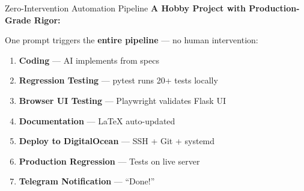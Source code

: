 \documentclass[aspectratio=169,11pt]{beamer}
\begin{document}
\begin{frame}{Zero-Intervention Automation Pipeline}
\textbf{A Hobby Project with Production-Grade Rigor:}

One prompt triggers the \textbf{entire pipeline} --- no human intervention:

\begin{enumerate}
    \item \textcolor{blue!70}{\textbf{Coding}} --- AI implements from specs
    \item \textcolor{orange!70}{\textbf{Regression Testing}} --- pytest runs 20+ tests locally
    \item \textcolor{purple!70}{\textbf{Browser UI Testing}} --- Playwright validates Flask UI
    \item \textcolor{green!70}{\textbf{Documentation}} --- LaTeX auto-updated
    \item \textcolor{cyan!70}{\textbf{Deploy to DigitalOcean}} --- SSH + Git + systemd
    \item \textcolor{orange!70}{\textbf{Production Regression}} --- Tests on live server
    \item \textcolor{red!70}{\textbf{Telegram Notification}} --- ``Done!''
\end{enumerate}

\vspace{0.2cm}
\begin{center}
\end{center}
\end{frame}
\end{document}
